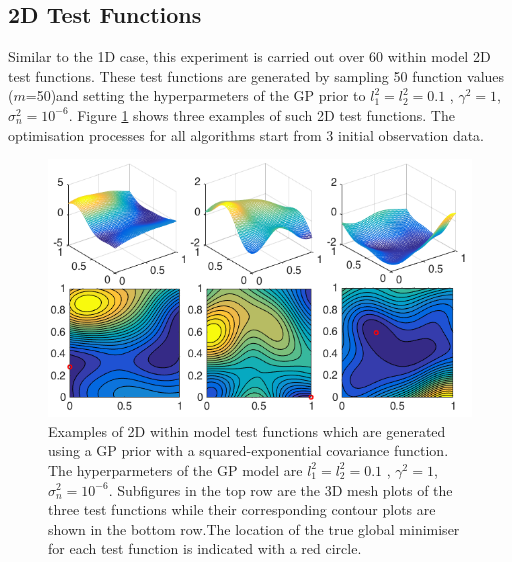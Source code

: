 \documentclass[a4paper,11pt]{report}
\begin{document}
\subsection{2D Test Functions}
Similar to the 1D case, this experiment is carried out over 60 within model 2D test functions. These test functions are generated by sampling 50 function values ($m$=50)and setting the hyperparmeters of the GP prior to  $ l_1^2=l_2^2=0.1$ , $\gamma^2=1 $,  $\sigma_n^2= 10^{-6}$. Figure \ref{2Dtestfunctions} shows three examples of such 2D test functions. The optimisation processes for all algorithms start from 3 initial observation data.
\\
 \begin{figure} [H] \label{2Dtestfunctions}
	\centering
	 \includegraphics[width=0.9\linewidth]{2Dtestfunction.png}
\caption{Examples of 2D within model test functions which are generated using a GP prior with a squared-exponential covariance function. The hyperparmeters of the GP model are  $ l_1^2=l_2^2=0.1$ , $\gamma^2=1 $,  $\sigma_n^2= 10^{-6}$. Subfigures in the top row are the 3D mesh plots of the three test functions while their corresponding contour plots are shown in the bottom row.The location of the true global minimiser for each test function is indicated with a red circle.}
\end{figure}
\end{document}
